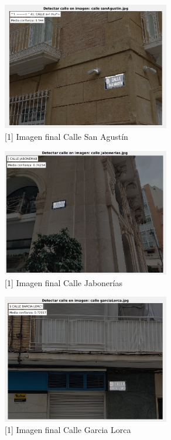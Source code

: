 \documentclass[12pt]{article}
\begin{document}
		\begin{figure}[h!]
			\begin{center}
				\includegraphics[width=0.65\textwidth]{img/1_4.png}
				\caption{[1] Imagen final Calle San Agustín}
			\end{center}
		\end{figure}
		
		\pagebreak
		
		\begin{figure}[h!]
			\begin{center}
				\includegraphics[width=0.65\textwidth]{img/1_5.png}
				\caption{[1] Imagen final Calle Jabonerías}
			\end{center}
		\end{figure}
		
		\begin{figure}[h!]
			\begin{center}
				\includegraphics[width=0.65\textwidth]{img/1_6.png}
				\caption{[1] Imagen final Calle Garcia Lorca}
			\end{center}
		\end{figure}
		
\end{document}
